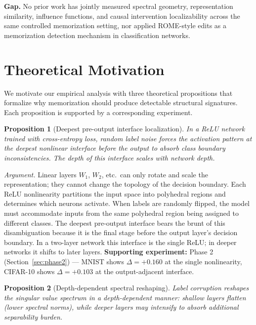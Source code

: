 \documentclass{article}
\newtheorem{proposition}{Proposition}
\begin{document}
\textbf{Gap.} No prior work has jointly measured spectral geometry, representation similarity, influence functions, and causal intervention localizability across the same controlled memorization setting, nor applied ROME-style edits as a memorization detection mechanism in classification networks.

\section{Theoretical Motivation}
\label{sec:theory}

We motivate our empirical analysis with three theoretical propositions that formalize why memorization should produce detectable structural signatures. Each proposition is supported by a corresponding experiment.

\begin{proposition}[Deepest pre-output interface localization]
\label{prop:nonlinearity}
In a ReLU network trained with cross-entropy loss, random label noise forces the activation pattern at the deepest nonlinear interface before the output to absorb class boundary inconsistencies. The depth of this interface scales with network depth.
\end{proposition}

\textit{Argument.} Linear layers $W_1$, $W_2$, etc.\ can only rotate and scale the representation; they cannot change the topology of the decision boundary. Each ReLU nonlinearity partitions the input space into polyhedral regions and determines which neurons activate. When labels are randomly flipped, the model must accommodate inputs from the same polyhedral region being assigned to different classes. The deepest pre-output interface bears the brunt of this disambiguation because it is the final stage before the output layer's decision boundary. In a two-layer network this interface is the single ReLU; in deeper networks it shifts to later layers. \textbf{Supporting experiment:} Phase 2 (Section~\ref{sec:phase2}) — MNIST shows $\Delta=+0.160$ at the single nonlinearity, CIFAR-10 shows $\Delta=+0.103$ at the output-adjacent interface.

\begin{proposition}[Depth-dependent spectral reshaping]
\label{prop:spectral}
Label corruption reshapes the singular value spectrum in a depth-dependent manner: shallow layers flatten (lower spectral norms), while deeper layers may intensify to absorb additional separability burden.
\end{proposition}
\end{document}

